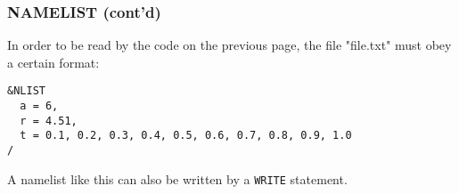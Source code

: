 \begin{frame}[fragile]
  \frametitle{NAMELIST (cont'd)}

  In order to be read by the code on the previous page, the file "file.txt" must
  obey a certain format:

  \begin{lstlisting}
&NLIST
  a = 6,
  r = 4.51,
  t = 0.1, 0.2, 0.3, 0.4, 0.5, 0.6, 0.7, 0.8, 0.9, 1.0
/
  \end{lstlisting}

  A namelist like this can also be written by a \texttt{WRITE} statement.

\end{frame}
